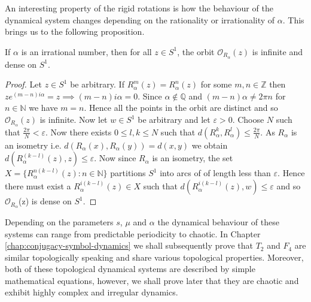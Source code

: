 An interesting property of the rigid rotations is how the behaviour of the dynamical system changes depending on the rationality or irrationality of $\alpha$. This brings us to the following proposition.

\begin{prop} \label{prop:rigid-rotations-irrational}
    If $\alpha$ is an irrational number, then for all $z \in S^1$, the orbit $\mathcal{O}_{R_\alpha}(z)$ is infinite and dense on $S^1$.
    \begin{proof}
        Let $z \in S^1$ be arbitrary. If $R_\alpha^m(z) = R_\alpha^n(z)$ for some $m, n \in \mathbb{Z}$ then $ze^{(m-n)i\alpha} = z \implies (m - n)i\alpha = 0$. Since $\alpha \notin \mathbb{Q}$ and $(m - n)\alpha \neq 2\pi n$ for $n \in \mathbb{N}$ we have $m = n$. Hence all the points in the orbit are distinct and so $\mathcal{O}_{R_\alpha}(z)$ is infinite. Now let $w \in S^1$ be arbitrary and let $\varepsilon > 0$. Choose $N$ such that $\frac{2\pi}{N} < \varepsilon$. Now there exists $0 \leq l, k \leq N$ such that $d\left( R_\alpha^k, R_\alpha^l \right) \leq \frac{2\pi}{N}$. As $R_\alpha$ is an isometry i.e. $d(R_\alpha(x), R_\alpha(y)) = d(x, y)$ we obtain $d(R_\alpha^{(k - l)}(z), z) \leq \varepsilon$. Now since $R_\alpha$ is an isometry, the set $X = \lbrace R_\alpha^{n(k - l)}(z) : n \in \mathbb{N} \rbrace$ partitions $S^1$ into arcs of of length less than $\varepsilon$. Hence there must exist a $R_\alpha^{i(k - l)}(z) \in X$ such that $d(R_\alpha^{i(k - l)}(z), w) \leq \varepsilon$ and so $\mathcal{O}_{R_{\alpha}}$(z) is dense on $S^1$.
    \end{proof}
\end{prop}

Depending on the parameters $s$, $\mu$ and $\alpha$ the dynamical behaviour of these systems can range from predictable periodicity to chaotic. In Chapter \ref{chap:conjugacy-symbol-dynamics} we shall subsequently prove that $T_2$ and $F_4$ are similar topologically speaking and share various topological properties. Moreover, both of these topological dynamical systems are described by simple mathematical equations, however, we shall prove later that they are chaotic and exhibit highly complex and irregular dynamics.